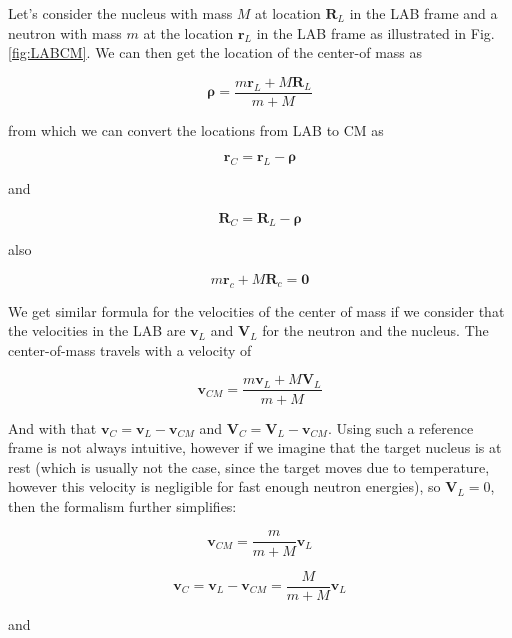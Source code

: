 Let's consider the nucleus with mass $M$ at location $\mathbf{R}_L$ in the LAB frame and a neutron with mass $m$ at the location $\mathbf{r}_L$ in the LAB frame as illustrated in Fig. \ref{fig:LABCM}. We can then get the location of the center-of mass as 

\begin{equation}
\mathbf{\rho} = \frac{m\mathbf{r}_L+M\mathbf{R}_L}{m+M}
\end{equation}

from which we can convert the locations from LAB to CM as 

\begin{equation}
\mathbf{r}_C=\mathbf{r}_L - \mathbf{\rho}
\end{equation}

\noindent and

\begin{equation}
\mathbf{R}_C=\mathbf{R}_L - \mathbf{\rho}
\end{equation}

\noindent also

$$m\mathbf{r}_c + M\mathbf{R}_c = \mathbf{0}$$

We get similar formula for the velocities of the center of mass if we consider that the velocities in the LAB are $\mathbf{v}_L$ and $\mathbf{V}_L$ for the neutron and the nucleus. The center-of-mass travels with a velocity of

\begin{equation}
\mathbf{v}_{CM} = \frac{m\mathbf{v}_L+M\mathbf{V}_L}{m+M}
\end{equation}

And with that $\mathbf{v}_C=\mathbf{v}_L - \mathbf{v}_{CM}$ and $\mathbf{V}_C=\mathbf{V}_L - \mathbf{v}_{CM}$. Using such a reference frame is not always intuitive, however if we imagine that the target nucleus is at rest (which is usually not the case, since the target moves due to temperature, however this velocity is negligible for fast enough neutron energies), so $\mathbf{V}_L=0$, then the formalism further simplifies:

\begin{equation}
\mathbf{v}_{CM}=\frac{m}{m+M}\mathbf{v}_L
\end{equation}

\begin{equation}
\mathbf{v}_C=\mathbf{v}_L-\mathbf{v}_{CM}=\frac{M}{m+M}\mathbf{v}_L
\end{equation}

and

